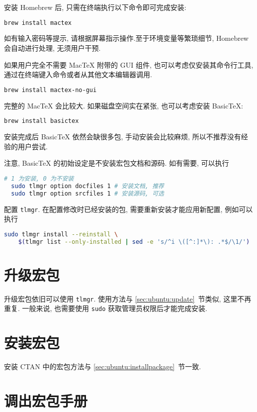 安装 Homebrew 后,
只需在\textsf{终端}执行以下命令即可完成安装:
\begin{lstlisting}[language=bash]
  brew install mactex
\end{lstlisting}
如有输入密码等提示, 请根据屏幕指示操作.至于环境变量等繁琐细节, Homebrew 会自动进行处理,
无须用户干预.

如果用户完全不需要 Mac\TeX{} 附带的 GUI 组件, 也可以考虑仅安装其命令行工具, 通过在终端键入命令或者从其他文本编辑器调用.
\begin{lstlisting}[language=bash]
  brew install mactex-no-gui
\end{lstlisting}

完整的 Mac\TeX{} 会比较大. 如果磁盘空间实在紧张, 也可以考虑安装 Basic\TeX:
\begin{lstlisting}[language=bash]
  brew install basictex
\end{lstlisting}
安装完成后 Basic\TeX{} 依然会缺很多包, 手动安装会比较麻烦, 所以不推荐没有经验的用户尝试.

注意, Basic\TeX{} 的初始设定是不安装宏包文档和源码. 如有需要, 可以执行
\begin{lstlisting}[language=bash]
  # 1 为安装, 0 为不安装
  sudo tlmgr option docfiles 1 # 安装文档, 推荐
  sudo tlmgr option srcfiles 1 # 安装源码, 可选
\end{lstlisting}
配置 \texttt{tlmgr}. 在配置修改时已经安装的包, 需要重新安装才能应用新配置, 例如可以执行
\begin{lstlisting}[language=bash]
  sudo tlmgr install --reinstall \
    $(tlmgr list --only-installed | sed -e 's/^i \([^:]*\): .*$/\1/')
\end{lstlisting}

\section{升级宏包}

升级宏包依旧可以使用 \texttt{tlmgr}.
使用方法与 \ref{sec:ubuntu:update}~节类似, 这里不再重复.
一般来说, 也需要使用 \texttt{sudo} 获取管理员权限后才能完成安装.

\section{安装宏包}

安装 CTAN 中的宏包方法与 \ref{sec:ubuntu:installpackage}~节一致.

\section{调出宏包手册}

